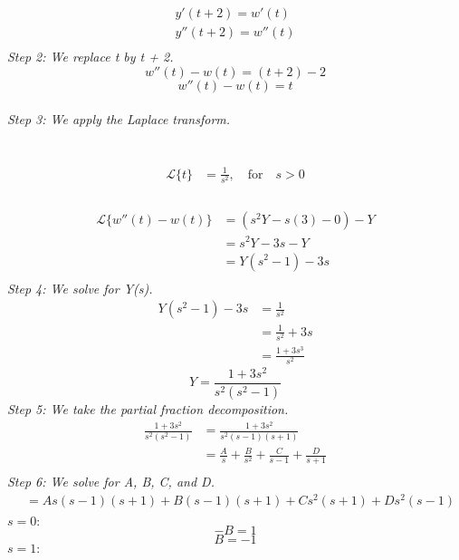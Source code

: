 \documentclass{article}
\begin{document}
     \begin{align*}
        y'(t + 2) = w'(t) \\
        y''(t + 2) = w''(t) \\
     \end{align*}
    \textit{Step 2: We replace t by t + 2.} \\
    $$w''(t) - w(t) = (t + 2) - 2$$
    $$w''(t) - w(t) = t$$ \\
    \textit{Step 3: We apply the Laplace transform.} \\ \\
     \\
    \begin{align*}
        \mathcal{L}\{t\} &= \frac{1}{s^{2}}, \quad \text{for}  \quad s > 0 \\
    \end{align*}
     \\
    \begin{align*}
        \mathcal{L}\{w''(t) - w(t)\} &= (s^{2}Y -s(3) - 0) - Y \\
        &= s^{2}Y - 3s - Y \\
        &= Y(s^{2} - 1) - 3s \\
    \end{align*}
    \textit{Step 4: We solve for Y(s).} \\
    \begin{align*}
        Y(s^{2} - 1) - 3s &= \frac{1}{s^{2}} \\
        &= \frac{1}{s^{2}} + 3s \\
        &= \frac{1 + 3s^{3}}{s^{2}}
    \end{align*}
    $$Y = \frac{1 + 3s^{2}}{s^{2}(s^{2} - 1)}$$
\textit{Step 5: We take the partial fraction decomposition.} \\
\begin{align*}
    \frac{1 + 3s^{2}}{s^{2}(s^{2} - 1)} &= \frac{1 + 3s^{2}}{s^{2}(s -1)(s + 1)}\\
    &= \frac{A}{s} + \frac{B}{s^{2}} + \frac{C}{s - 1} + \frac{D}{s + 1} \\
\end{align*}
\textit{Step 6: We solve for A, B, C, and D.} \\
\begin{align*}
    &= As(s - 1)(s + 1) + B(s - 1)(s + 1) + Cs^{2}(s + 1) + Ds^{2}(s - 1) \\
\end{align*}
    $s = 0:$
    $$-B = 1$$
    $$B = -1$$
    $s = 1:$
\end{document}
